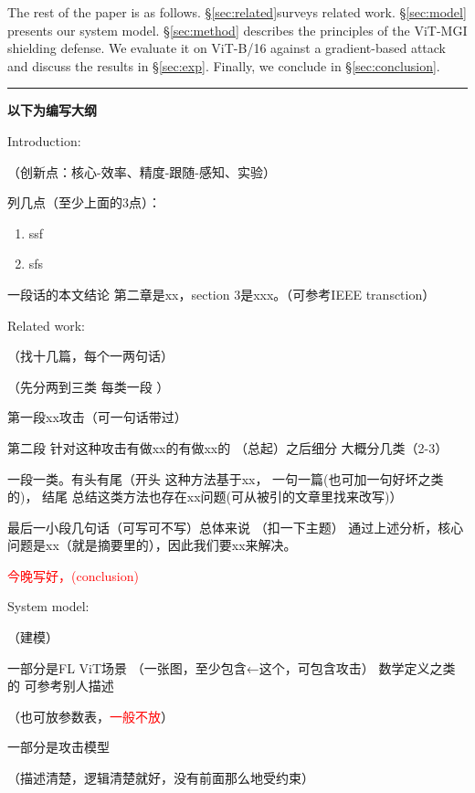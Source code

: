 \documentclass[conference]{IEEEtran}
\begin{document}
The rest of the paper is as follows. \hyperref[sec:related]{§\ref{sec:related}}surveys related work. \hyperref[sec:model]{§\ref{sec:model}} presents our system model. \hyperref[sec:method]{§\ref{sec:method}} describes the principles of the ViT-MGI shielding defense. We evaluate it on ViT-B/16 against a gradient-based attack and discuss the results in \hyperref[sec:exp]{§\ref{sec:exp}}. Finally, we conclude in \hyperref[sec:conclusion]{§\ref{sec:conclusion}}.


\vspace{0.25cm}
\rule{\linewidth}{0.4pt}
\centerline{\Large\bf{以下为编写大纲}}
\vspace{1cm}

Introduction:

（创新点：核心-效率、精度-跟随-感知、实验）

列几点（至少上面的3点）：

\begin{enumerate}
    \item ssf
    \item sfs
\end{enumerate}

一段话的本文结论 第二章是xx，section 3是xxx。（可参考IEEE transction）





Related work:

（找十几篇，每个一两句话）

（先分两到三类  每类一段 ）

第一段xx攻击（可一句话带过）

第二段 针对这种攻击有做xx的有做xx的 （总起）之后细分 大概分几类（2-3）

一段一类。有头有尾（开头 这种方法基于xx，   一句一篇(也可加一句好坏之类的)，   结尾 总结这类方法也存在xx问题(可从被引的文章里找来改写)）

最后一小段几句话（可写可不写）总体来说  （扣一下主题）   通过上述分析，核心问题是xx（就是摘要里的），因此我们要xx来解决。


\textcolor{red}{今晚写好，(conclusion)}


System model:

（建模） 

一部分是FL ViT场景 （一张图，至少包含←这个，可包含攻击）  数学定义之类的   可参考别人描述

（也可放参数表，\textcolor{red}{一般不放}）

一部分是攻击模型   

（描述清楚，逻辑清楚就好，没有前面那么地受约束）
\end{document}
